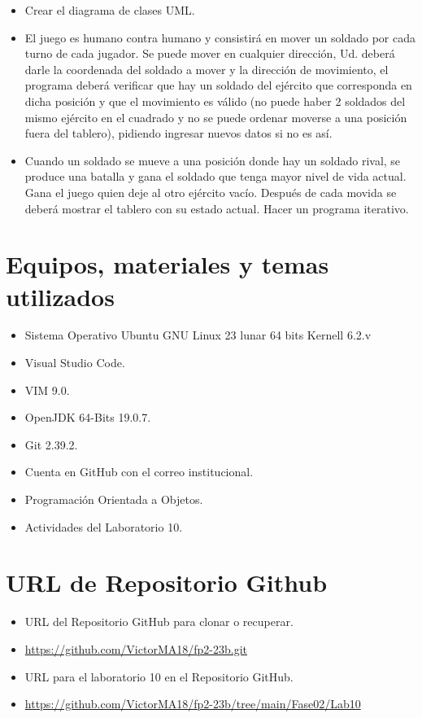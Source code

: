 \documentclass{article}
\begin{document}
\begin{itemize}
		\item Crear el diagrama de clases UML.
		\item El juego es humano contra humano y consistirá en mover un soldado por cada turno de cada jugador. Se puede mover en cualquier dirección, Ud. deberá darle la coordenada del soldado a mover y la dirección de movimiento, el programa deberá verificar que hay un soldado del ejército que corresponda en dicha posición y que el movimiento es válido (no puede haber 2 soldados del mismo ejército en el cuadrado y no se puede ordenar moverse a una posición fuera del tablero), pidiendo ingresar nuevos datos si no es así.
		\item Cuando un soldado se mueve a una posición donde hay un soldado rival, se produce una batalla y gana el soldado que tenga mayor nivel de vida actual. Gana el juego quien deje al otro ejército vacío. Después de cada movida se deberá mostrar el tablero con su estado actual. Hacer un programa iterativo.
	\end{itemize}

	\section{Equipos, materiales y temas utilizados}
	\begin{itemize}
		\item Sistema Operativo Ubuntu GNU Linux 23 lunar 64 bits Kernell 6.2.v
		\item Visual Studio Code.
		\item VIM 9.0.
		\item OpenJDK 64-Bits 19.0.7.
		\item Git 2.39.2.
		\item Cuenta en GitHub con el correo institucional.
		\item Programación Orientada a Objetos.
		\item Actividades del Laboratorio 10.	
	\end{itemize}
	
	\section{URL de Repositorio Github}
	\begin{itemize}
		\item URL del Repositorio GitHub para clonar o recuperar.
		\item \url{https://github.com/VictorMA18/fp2-23b.git}
		\item URL para el laboratorio 10 en el Repositorio GitHub.
		\item \url{https://github.com/VictorMA18/fp2-23b/tree/main/Fase02/Lab10}
	\end{itemize}
	
\end{document}
